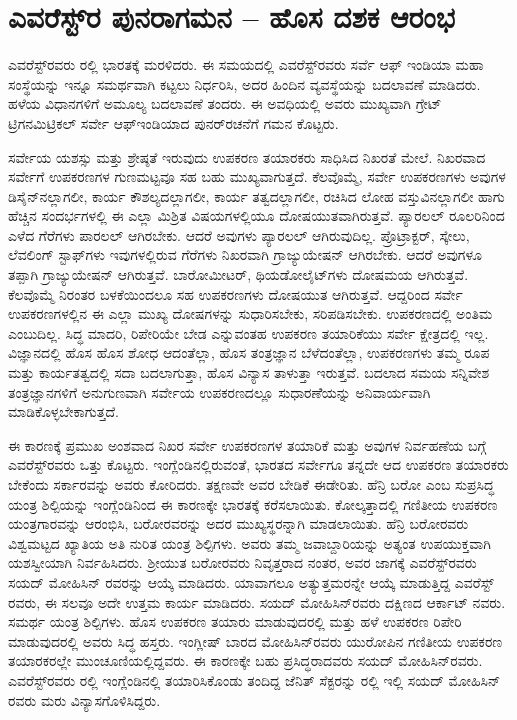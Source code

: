 
\chapter{ಎವರೆಸ್ಟ್​ರ ಪುನರಾಗಮನ – ಹೊಸ ದಶಕ ಆರಂಭ}

ಎವರೆಸ್ಟ್‌ರವರು ರಲ್ಲಿ ಭಾರತಕ್ಕೆ ಮರಳಿದರು. ಈ ಸಮಯದಲ್ಲಿ ಎವರೆಸ್ಟ್​ರವರು ಸರ್ವೆ ಆಫ್​ ಇಂಡಿಯಾ ಮಹಾ ಸಂಸ್ಥೆಯನ್ನು ಇನ್ನೂ ಸಮರ್ಥವಾಗಿ ಕಟ್ಟಲು ನಿರ್ಧರಿಸಿ, ಅದರ ಹಿಂದಿನ ವ್ಯವಸ್ಥೆಯನ್ನು ಬದಲಾವಣೆ ಮಾಡಿದರು. ಹಳೆಯ ವಿಧಾನಗಳಿಗೆ ಅಮೂಲ್ಯ ಬದಲಾವಣೆ ತಂದರು. ಈ ಅವಧಿಯಲ್ಲಿ ಅವರು ಮುಖ್ಯವಾಗಿ ಗ್ರೇಟ್​ ಟ್ರಿಗನಮಿಟ್ರಿಕಲ್​ ಸರ್ವೇ ಆಫ್​ ಇಂಡಿಯಾದ ಪುನರ್​ರಚನೆಗೆ ಗಮನ ಕೊಟ್ಟರು.

ಸರ್ವೇಯ ಯಶಸ್ಸು ಮತ್ತು ಶ್ರೇಷ್ಠತೆ ಇರುವುದು ಉಪಕರಣ ತಯಾರಕರು ಸಾಧಿಸಿದ ನಿಖರತೆ ಮೇಲೆ. ನಿಖರವಾದ ಸರ್ವೇಗೆ ಉಪಕರಣಗಳ ಗುಣಮಟ್ಟವೂ ಸಹ ಬಹು ಮುಖ್ಯವಾಗುತ್ತದೆ. ಕೆಲವೊಮ್ಮೆ, ಸರ್ವೇ ಉಪಕರಣಗಳು ಅವುಗಳ ಡಿಸೈನ್​ನಲ್ಲಾಗಲೀ, ಕಾರ್ಯ ಕೌಶಲ್ಯದಲ್ಲಾಗಲೀ, ಕಾರ್ಯ ತತ್ವದಲ್ಲಾಗಲೀ, ರಚಿಸಿದ ಲೋಹ ವಸ್ತುವಿನಲ್ಲಾಗಲೀ ಹಾಗು ಹೆಚ್ಚಿನ ಸಂದರ್ಭಗಳಲ್ಲಿ ಈ ಎಲ್ಲಾ ಮಿಶ್ರಿತ ವಿಷಯಗಳಲ್ಲಿಯೂ ದೋಷಯುತವಾಗಿರುತ್ತವೆ. ಪ್ಯಾರಲಲ್​ ರೂಲರಿನಿಂದ ಎಳೆದ ಗೆರೆಗಳು ಪಾರಲಲ್​ ಆಗಿರಬೇಕು. ಆದರೆ ಅವುಗಳು ಪ್ಯಾರಲಲ್​ ಆಗಿರುವುದಿಲ್ಲ. ಪ್ರೊಟ್ರಾಕ್ಟರ್​, ಸ್ಕೇಲು, ಲೆವಲಿಂಗ್​ ಸ್ಟಾಫ್​ಗಳು ಇವುಗಳಲ್ಲಿರುವ ಗೆರೆಗಳು ನಿಖರವಾಗಿ ಗ್ರಾಜ್ಯುಯೇಷನ್​ ಆಗಿರಬೇಕು. ಆದರೆ ಅವುಗಳೂ ತಪ್ಪಾಗಿ ಗ್ರಾಜ್ಯುಯೇಷನ್​ ಆಗಿರುತ್ತವೆ. ಬಾರೋಮೀಟರ್​, ಥಿಯಡೋಲೈಟ್​ಗಳು ದೋಷಮಯ ಆಗಿರುತ್ತವೆ. ಕೆಲವೊಮ್ಮೆ ನಿರಂತರ ಬಳಕೆಯಿಂದಲೂ ಸಹ ಉಪಕರಣಗಳು ದೋಷಯುತ ಆಗಿರುತ್ತವೆ. ಆದ್ದರಿಂದ ಸರ್ವೇ ಉಪಕರಣಗಳಲ್ಲಿನ ಈ ಎಲ್ಲಾ ಮುಖ್ಯ ದೋಷಗಳನ್ನು ಸುಧಾರಿಸಬೇಕು, ಸರಿಪಡಿಸಬೇಕು. ಉಪಕರಣದಲ್ಲಿ ಅಂತಿಮ ಎಂಬುದಿಲ್ಲ. ಸಿದ್ಧ ಮಾದರಿ, ರಿಪೇರಿಯೇ ಬೇಡ ಎನ್ನುವಂತಹ ಉಪಕರಣ ತಯಾರಿಕೆಯು ಸರ್ವೇ ಕ್ಷೇತ್ರದಲ್ಲಿ ಇಲ್ಲ. ವಿಜ್ಞಾನದಲ್ಲಿ ಹೊಸ ಹೊಸ ಶೋಧ ಆದಂತೆಲ್ಲಾ, ಹೊಸ ತಂತ್ರಜ್ಞಾನ ಬೆಳೆದಂತೆಲ್ಲಾ, ಉಪಕರಣಗಳು ತಮ್ಮ ರೂಪ ಮತ್ತು ಕಾರ್ಯತತ್ವದಲ್ಲಿ ಸದಾ ಬದಲಾಗುತ್ತಾ, ಹೊಸ ವಿನ್ಯಾಸ ತಾಳುತ್ತಾ ಇರುತ್ತವೆ. ಬದಲಾದ ಸಮಯ ಸನ್ನಿವೇಶ ತಂತ್ರಜ್ಞಾನಗಳಿಗೆ ಅನುಗುಣವಾಗಿ ಸರ್ವೇಯ ಉಪಕರಣದಲ್ಲೂ ಸುಧಾರಣೆೆಯನ್ನು ಅನಿವಾರ್ಯವಾಗಿ ಮಾಡಿಕೊಳ್ಳಬೇಕಾಗುತ್ತದೆ.

ಈ ಕಾರಣಕ್ಕೆ ಪ್ರಮುಖ ಅಂಶವಾದ ನಿಖರ ಸರ್ವೇ ಉಪಕರಣಗಳ ತಯಾರಿಕೆ ಮತ್ತು ಅವುಗಳ ನಿರ್ವಹಣೆಯ ಬಗ್ಗೆ ಎವರೆಸ್ಟ್​ರವರು ಒತ್ತು ಕೊಟ್ಟರು. ಇಂಗ್ಲೆಂಡಿನಲ್ಲಿರುವಂತೆ, ಭಾರತದ ಸರ್ವೇಗೂ ತನ್ನದೇ ಆದ ಉಪಕರಣ ತಯಾರಕರು ಬೇಕೆಂದು ಸರ್ಕಾರವನ್ನು ಅವರು ಕೋರಿದರು. ತಕ್ಷಣವೇ ಅವರ ಬೇಡಿಕೆ ಈಡೇರಿತು. ಹೆನ್ರಿ ಬರೋ ಎಂಬ ಸುಪ್ರಸಿದ್ಧ ಯಂತ್ರ ಶಿಲ್ಪಿಯನ್ನು ಇಂಗ್ಲೆಂಡಿನಿಂದ ಈ ಕಾರಣಕ್ಕೇ ಭಾರತಕ್ಕೆ ಕರೆಸಲಾಯಿತು. ಕೋಲ್ಕತ್ತಾದಲ್ಲಿ ಗಣಿತೀಯ ಉಪಕರಣ ಯಂತ್ರಗಾರವನ್ನು ಆರಂಭಿಸಿ, ಬರೋರವರನ್ನು ಅದರ ಮುಖ್ಯಸ್ಥರನ್ನಾಗಿ ಮಾಡಲಾಯಿತು. ಹೆನ್ರಿ ಬರೋರವರು ವಿಶ್ವಮಟ್ಟದ ಖ್ಯಾತಿಯ ಅತಿ ನುರಿತ ಯಂತ್ರ ಶಿಲ್ಪಿಗಳು. ಅವರು ತಮ್ಮ ಜವಾಬ್ದಾರಿಯನ್ನು ಅತ್ಯಂತ ಉಪಯುಕ್ತವಾಗಿ ಯಶಸ್ವೀಯಾಗಿ ನಿರ್ವಹಿಸಿದರು. ಶ‍್ರೀಯುತ ಬರೋರವರು ನಿವೃತ್ತರಾದ ನಂತರ, ಅವರ ಜಾಗಕ್ಕೆ ಎವರೆಸ್ಟ್​ರವರು ಸಯದ್​ ಮೋಹಿಸಿನ್​ ರವರನ್ನು ಆಯ್ಕೆ ಮಾಡಿದರು. ಯಾವಾಗಲೂ ಅತ್ಯುತ್ತಮರನ್ನೇ ಆಯ್ಕೆ ಮಾಡುತ್ತಿದ್ದ ಎವರೆಸ್ಟ್​ರವರು, ಈ ಸಲವೂ ಅದೇ ಉತ್ತಮ ಕಾರ್ಯ ಮಾಡಿದರು. ಸಯದ್​ ಮೋಹಿಸಿನ್​ರವರು ದಕ್ಷಿಣದ ಆರ್ಕಾಟ್​ ನವರು. ಸಮರ್ಥ ಯಂತ್ರ ಶಿಲ್ಪಿಗಳು. ಹೊಸ ಉಪಕರಣ ತಯಾರು ಮಾಡುವುದರಲ್ಲಿ ಮತ್ತು ಹಳೆ ಉಪಕರಣ ರಿಪೇರಿ ಮಾಡುವುದರಲ್ಲಿ ಅವರು ಸಿದ್ಧ ಹಸ್ತರು. ಇಂಗ್ಲೀಷ್​ ಬಾರದ ಮೋಹಿಸಿನ್​ರವರು ಯುರೋಪಿನ ಗಣಿತೀಯ ಉಪಕರಣ ತಯಾರಕರಲ್ಲೇ ಮುಂಚೂಣಿಯಲ್ಲಿದ್ದವರು. ಈ ಕಾರಣಕ್ಕೇ ಬಹು ಪ್ರಸಿದ್ಧರಾದವರು ಸಯದ್​ ಮೋಹಿಸಿನ್​ರವರು. ಎವರೆಸ್ಟ್​ ರವರು ರಲ್ಲಿ ಇಂಗ್ಲೆಂಡಿನಲ್ಲಿ ತಯಾರಿಸಿಕೊಂಡು ತಂದಿದ್ದ ಜೆನಿತ್​ ಸೆಕ್ಟರನ್ನು  ರಲ್ಲಿ ಇಲ್ಲಿ ಸಯದ್​ ಮೋಹಿಸಿನ್​ರವರು ಮರು ವಿನ್ಯಾಸಗೊಳಿಸಿದ್ದರು.

